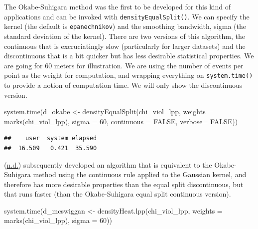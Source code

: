 \documentclass[
  krantz2]{krantz}
\makeatletter
\newenvironment{Shaded}{\begin{snugshade}}{\end{snugshade}}
\newcommand{\AttributeTok}[1]{\textcolor[rgb]{0.61,0.61,0.61}{#1}}
\newcommand{\ConstantTok}[1]{\textcolor[rgb]{0,0,0}{#1}}
\newcommand{\DecValTok}[1]{\textcolor[rgb]{0.06,0.06,0.06}{#1}}
\newcommand{\FunctionTok}[1]{\textcolor[rgb]{0,0,0}{#1}}
\newcommand{\NormalTok}[1]{#1}
\newcommand{\OtherTok}[1]{\textcolor[rgb]{0.37,0.37,0.37}{#1}}
\newenvironment{kframe}{%
\medskip{}
\setlength{\fboxsep}{.8em}
 \def\at@end@of@kframe{}%
 \ifinner\ifhmode%
  \def\at@end@of@kframe{\end{minipage}}%
  \begin{minipage}{\columnwidth}%
 \fi\fi%
 \def\FrameCommand##1{\hskip\@totalleftmargin \hskip-\fboxsep
 \colorbox{shadecolor}{##1}\hskip-\fboxsep
     \hskip-\linewidth \hskip-\@totalleftmargin \hskip\columnwidth}%
 \MakeFramed {\advance\hsize-\width
   \@totalleftmargin\z@ \linewidth\hsize
   \@setminipage}}%
 {\par\unskip\endMakeFramed%
 \at@end@of@kframe}
\renewenvironment{Shaded}{\begin{kframe}}{\end{kframe}}
\makeatother
\begin{document}
The Okabe-Suhigara method was the first to be developed for this kind of applications and can be invoked with \texttt{densityEqualSplit()}. We can specify the kernel (the default is \texttt{epanechnikov}) and the smoothing bandwidth, sigma (the standard deviation of the kernel). There are two versions of this algorithm, the continuous that is excruciatingly slow (particularly for larger datasets) and the discontinuous that is a bit quicker but has less desirable statistical properties. We are going for 60 meters for illustration. We are using the number of events per point as the weight for computation, and wrapping everything on \texttt{system.time()} to provide a notion of computation time. We will only show the discontinuous version.

\begin{Shaded}
\begin{Highlighting}[]
\FunctionTok{system.time}\NormalTok{(d\_okabe }\OtherTok{\textless{}{-}} \FunctionTok{densityEqualSplit}\NormalTok{(chi\_viol\_lpp, }
                                         \AttributeTok{weights =} \FunctionTok{marks}\NormalTok{(chi\_viol\_lpp), }
                                         \AttributeTok{sigma =} \DecValTok{60}\NormalTok{,}
                                         \AttributeTok{continuous =} \ConstantTok{FALSE}\NormalTok{,}
                                         \AttributeTok{verbose=} \ConstantTok{FALSE}\NormalTok{))}
\end{Highlighting}
\end{Shaded}

\begin{verbatim}
##    user  system elapsed 
##  16.509   0.421  35.590
\end{verbatim}

(\protect\hyperlink{ref-McSwiggan_2016}{n.d.}) subsequently developed an algorithm that is equivalent to the Okabe-Suhigara method using the continuous rule applied to the Gaussian kernel, and therefore has more desirable properties than the equal split discontinuous, but that runs faster (than the Okabe-Suhigara equal split continuous version).

\begin{Shaded}
\begin{Highlighting}[]
\FunctionTok{system.time}\NormalTok{(d\_mcswiggan }\OtherTok{\textless{}{-}} \FunctionTok{densityHeat.lpp}\NormalTok{(chi\_viol\_lpp, }
                                    \AttributeTok{weights =} \FunctionTok{marks}\NormalTok{(chi\_viol\_lpp), }
                                    \AttributeTok{sigma =} \DecValTok{60}\NormalTok{))}
\end{Highlighting}
\end{Shaded}
\end{document}
